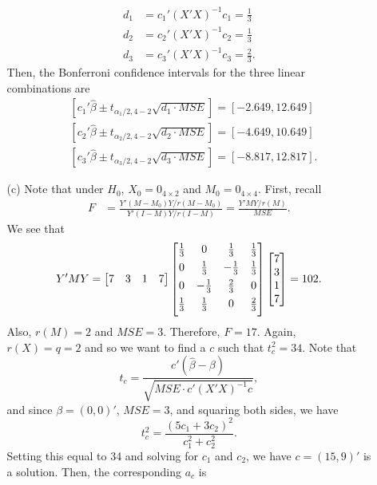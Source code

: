 \documentclass[11pt]{article}
\begin{document}
\begin{itemize}
\begin{itemize}
\begin{align*}
d_1 &= c_1'(X'X)^{-1}c_1 = \frac{1}{3} \\
d_2 &= c_2'(X'X)^{-1}c_2 = \frac{1}{3} \\
d_3 &= c_3'(X'X)^{-1}c_3 = \frac{2}{3}.
\end{align*}
Then, the Bonferroni confidence intervals for the three linear combinations are
\begin{align*}
&\left[c_1'\widehat{\beta}\pm t_{\alpha_1/2, 4 - 2}\sqrt{d_1\cdot MSE} \right] = \left[-2.649, 12.649 \right] \\
&\left[c_2'\widehat{\beta}\pm t_{\alpha_2/2, 4 - 2}\sqrt{d_2\cdot MSE} \right] = \left[-4.649, 10.649 \right] \\
&\left[c_3'\widehat{\beta}\pm t_{\alpha_3/2, 4 - 2}\sqrt{d_3\cdot MSE} \right] = \left[-8.817, 12.817 \right].
\end{align*}
\item[(c)]  Note that under $H_0$, $X_0 = 0_{4\times 2}$ and $M_0 = 0_{4\times 4}$.  First, recall
\begin{align*}
F &= \frac{Y'(M-M_0)Y/r(M-M_0)}{Y'(I-M)Y/r(I-M)} = \frac{Y'MY/r(M)}{MSE}.
\end{align*}
We see that
\[
Y'MY = \begin{bmatrix}
7 & 3 & 1 & 7
\end{bmatrix}\begin{bmatrix}
\frac{1}{3} & 0 & \frac{1}{3} \vspace{1.5mm}& \frac{1}{3} \\
0 & \frac{1}{3} & -\frac{1}{3} \vspace{1.5mm}& \frac{1}{3} \\
0 & -\frac{1}{3} & \frac{2}{3} \vspace{1.5mm}& 0 \\
\frac{1}{3} & \frac{1}{3} & 0 \vspace{1.5mm}& \frac{2}{3}
\end{bmatrix} \begin{bmatrix}
7 \\ 3 \\ 1 \\ 7
\end{bmatrix} = 102.
\]
Also, $r(M) = 2$ and $MSE = 3$.  Therefore, $F = 17$.  Again, $r(X) = q = 2$ and so we want to find a $c$ such that $t^2_c = 34$.  Note that
\[
t_c = \frac{c'(\widehat{\beta} - \beta)}{\sqrt{MSE\cdot c'(X'X)^{-1}c}},
\]
and since $\beta = (0,0)'$, $MSE = 3$, and squaring both sides, we have
\[
t_c^2 = \frac{(5c_1 + 3c_2)^2}{c_1^2 + c_2^2}.
\]
Setting this equal to 34 and solving for $c_1$ and $c_2$, we have $c = (15,9)'$ is a solution.  Then, the corresponding $a_c$ is

\end{itemize}
\end{itemize}
\end{document}
